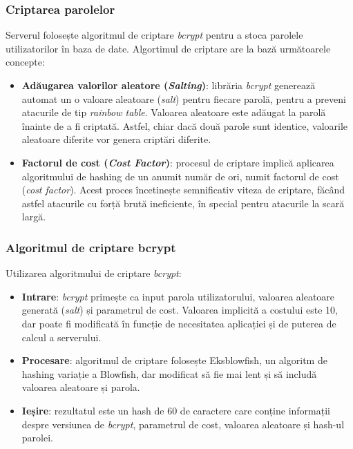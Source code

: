 \subsubsection{Criptarea parolelor}
Serverul folosește algoritmul de criptare \textit{bcrypt} pentru a stoca parolele utilizatorilor
în baza de date. Algortimul de criptare are la bază următoarele concepte:

\begin{itemize}
    \item \textbf{Adăugarea valorilor aleatore (\textit{Salting})}: librăria \textit{bcrypt} generează automat un o valoare aleatoare (\textit{salt})
    pentru fiecare parolă, pentru a preveni atacurile de tip \textit{rainbow table}. Valoarea aleatoare este
    adăugat la parolă înainte de a fi criptată. Astfel, chiar dacă două parole sunt identice,
    valoarile aleatoare diferite vor genera criptări diferite.
    \item \textbf{Factorul de cost (\textit{Cost Factor})}: procesul de criptare implică aplicarea algoritmului de hashing
    de un anumit număr de ori, numit factorul de cost (\textit{cost factor}). Acest proces încetinește semnificativ
    viteza de criptare, făcând astfel atacurile cu forță brută ineficiente, în special pentru
    atacurile la scară largă.
\end{itemize}

\subsubsection{Algoritmul de criptare bcrypt}

\par
Utilizarea algoritmului de criptare \textit{bcrypt}:

\begin{itemize}
    \item \textbf{Intrare}: \textit{bcrypt} primește ca input parola utilizatorului, valoarea aleatoare generată (\textit{salt})
    și parametrul de cost. Valoarea implicită a costului este 10, dar poate fi modificată în funcție
    de necesitatea aplicației și de puterea de calcul a serverului.
    \item \textbf{Procesare}: algoritmul de criptare folosește Eksblowfish, un algoritm de hashing
    variație a Blowfish, dar modificat să fie mai lent și să includă valoarea aleatoare și parola.
    \item \textbf{Ieșire}: rezultatul este un hash de 60 de caractere care conține informații despre
    versiunea de \textit{bcrypt}, parametrul de cost, valoarea aleatoare și hash-ul parolei.
\end{itemize}


